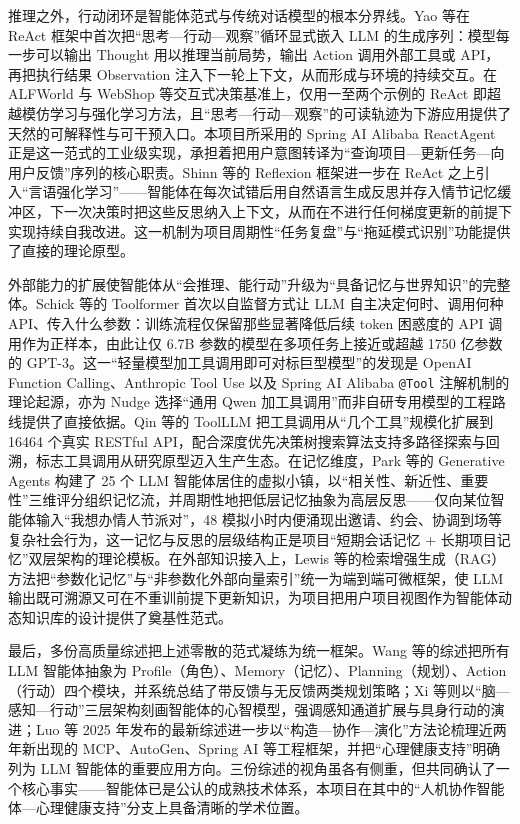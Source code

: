 \par 推理之外，行动闭环是智能体范式与传统对话模型的根本分界线。Yao 等在 ReAct 框架中首次把``思考—行动—观察''循环显式嵌入 LLM 的生成序列：模型每一步可以输出 Thought 用以推理当前局势，输出 Action 调用外部工具或 API，再把执行结果 Observation 注入下一轮上下文，从而形成与环境的持续交互\cite{yao2022react}。在 ALFWorld 与 WebShop 等交互式决策基准上，仅用一至两个示例的 ReAct 即超越模仿学习与强化学习方法，且``思考—行动—观察''的可读轨迹为下游应用提供了天然的可解释性与可干预入口。本项目所采用的 Spring AI Alibaba ReactAgent 正是这一范式的工业级实现，承担着把用户意图转译为``查询项目—更新任务—向用户反馈''序列的核心职责。Shinn 等的 Reflexion 框架进一步在 ReAct 之上引入``言语强化学习''——智能体在每次试错后用自然语言生成反思并存入情节记忆缓冲区，下一次决策时把这些反思纳入上下文，从而在不进行任何梯度更新的前提下实现持续自我改进\cite{shinn2023reflexion}。这一机制为项目周期性``任务复盘''与``拖延模式识别''功能提供了直接的理论原型。

\par 外部能力的扩展使智能体从``会推理、能行动''升级为``具备记忆与世界知识''的完整体。Schick 等的 Toolformer 首次以自监督方式让 LLM 自主决定何时、调用何种 API、传入什么参数：训练流程仅保留那些显著降低后续 token 困惑度的 API 调用作为正样本，由此让仅 6.7B 参数的模型在多项任务上接近或超越 1750 亿参数的 GPT-3\cite{schick2023toolformer}。这一``轻量模型加工具调用即可对标巨型模型''的发现是 OpenAI Function Calling、Anthropic Tool Use 以及 Spring AI Alibaba \texttt{@Tool} 注解机制的理论起源，亦为 Nudge 选择``通用 Qwen 加工具调用''而非自研专用模型的工程路线提供了直接依据。Qin 等的 ToolLLM 把工具调用从``几个工具''规模化扩展到 16464 个真实 RESTful API，配合深度优先决策树搜索算法支持多路径探索与回溯，标志工具调用从研究原型迈入生产生态\cite{qin2023toolllm}。在记忆维度，Park 等的 Generative Agents 构建了 25 个 LLM 智能体居住的虚拟小镇，以``相关性、新近性、重要性''三维评分组织记忆流，并周期性地把低层记忆抽象为高层反思——仅向某位智能体输入``我想办情人节派对''，48 模拟小时内便涌现出邀请、约会、协调到场等复杂社会行为\cite{park2023generative}，这一记忆与反思的层级结构正是项目``短期会话记忆 + 长期项目记忆''双层架构的理论模板。在外部知识接入上，Lewis 等的检索增强生成（RAG）方法把``参数化记忆''与``非参数化外部向量索引''统一为端到端可微框架，使 LLM 输出既可溯源又可在不重训前提下更新知识\cite{lewis2020rag}，为项目把用户项目视图作为智能体动态知识库的设计提供了奠基性范式。

\par 最后，多份高质量综述把上述零散的范式凝练为统一框架。Wang 等的综述把所有 LLM 智能体抽象为 Profile（角色）、Memory（记忆）、Planning（规划）、Action（行动）四个模块，并系统总结了带反馈与无反馈两类规划策略\cite{wang2023agents}；Xi 等则以``脑—感知—行动''三层架构刻画智能体的心智模型，强调感知通道扩展与具身行动的演进\cite{xi2023rise}；Luo 等 2025 年发布的最新综述进一步以``构造—协作—演化''方法论梳理近两年新出现的 MCP、AutoGen、Spring AI 等工程框架，并把``心理健康支持''明确列为 LLM 智能体的重要应用方向\cite{luo2025large}。三份综述的视角虽各有侧重，但共同确认了一个核心事实——智能体已是公认的成熟技术体系，本项目在其中的``人机协作智能体—心理健康支持''分支上具备清晰的学术位置。

